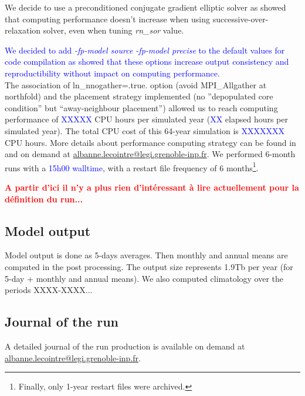 We decide to use a preconditioned conjugate gradient elliptic solver as \cite{report_sor} showed that computing performance doesn't increase when 
using successive-over-relaxation solver, even when tuning \textit{rn\_sor} value.


\textcolor{blue}{We decided to add \textit{-fp-model source -fp-model precise} to the default values for code compilation as \cite{Lecointre_perfNEMO3.4} showed that these options 
increase output consistency and reproductibility without impact on computing performance.} \\

The association of ln\_nnogather=.true. option (avoid MPI\_Allgather at northfold) and the placement strategy implemented 
(no ''depopulated core condition'' but ``away-neighbour placement'') allowed 
us to reach computing performance of \textcolor{blue}{XXXXX} CPU hours per simulated year (\textcolor{blue}{XX} elapsed hours per simulated year). 
The total CPU cost of this 64-year simulation is \textcolor{blue}{XXXXXXX} CPU hours. 
More details about performance computing strategy can be found in \cite{Lecointre2011,Lecointre_perfNEMO3.4} and on demand 
at \href{mailto:albanne.lecointre@legi.grenoble-inp.fr}{albanne.lecointre@legi.grenoble-inp.fr}. 
We performed 6-month runs with a \textcolor{blue}{15h00 walltime}, with a restart file frequency 
of 6 months\footnote{Finally, only 1-year restart files were archived.}.

\textcolor{red}{\textbf{A partir d'ici il n'y a plus rien d'int\'eressant \`a lire actuellement pour la d\'efinition du run...}}

\subsection{Model output}

Model output is done as 5-days averages. Then monthly and annual means are computed in the post processing. 
The output size represents 1.9Tb per year (for 5-day + monthly and annual means). 
We also computed climatology over the periods XXXX-XXXX...

\subsection{Journal of the run}

A detailed journal of the run production is available on demand at \href{mailto:albanne.lecointre@legi.grenoble-inp.fr}{albanne.lecointre@legi.grenoble-inp.fr}.

